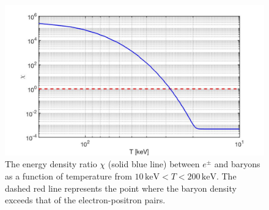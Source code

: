 \documentclass[universe,article,submit,moreauthors,pdftex,a4paper]{Definitions/mdpi}
\begin{document}
\begin{figure}[h]
\centering
\includegraphics[width=\textwidth]{./plots/EnergyDensityRatio002.jpg}
\caption{The energy density ratio $\chi$ (solid blue line) between $e^{\pm}$ and baryons as a function of temperature from $10\,\mathrm{keV}< T<200\,\mathrm{keV}$. The dashed red line represents the point where the baryon density exceeds that of the electron-positron pairs.}
\label{ratio_fig} 
\end{figure}
\end{document}
